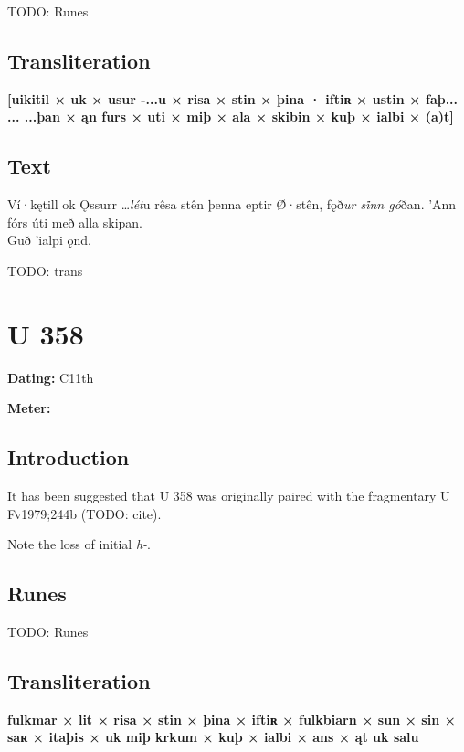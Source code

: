 TODO: Runes%

\subsection{Transliteration}

\textbf{[uikitil × uk × usur -...u × risa × stin × þina · iftiʀ × ustin × faþ... ... ...þan × ąn furs × uti × miþ × ala × skibin × kuþ × ialbi × (a)t]}

\subsection{Text}

\bpg\bpa[0]%
Ví·kętill ok Ǫssurr \dots \emph{lét}u rêsa stên þenna eptir Ø̂·stên, fǫð\emph{ur si̇nn gó}ðan. ’Ann fórs úti með alla skipan. \\
Guð ’ialpi ǫnd.\epa

\bpb TODO: trans\epb\epg

\sectionline\clearpage


\section{U 358}

\begin{flushright}%
\textbf{Dating:} C11th

\textbf{Meter:} \Fornyrdislag
\end{flushright}%

\subsection{Introduction}

It has been suggested that U 358 was originally paired with the fragmentary U Fv1979;244b (TODO: cite).

Note the loss of initial \emph{h-}.

\subsection{Runes}

TODO: Runes%

\subsection{Transliteration}

\textbf{fulkmar × lit × risa × stin × þina × iftiʀ × fulkbiarn × sun × sin × saʀ × itaþis × uk miþ krkum × kuþ × ialbi × ans × ąt uk salu}

